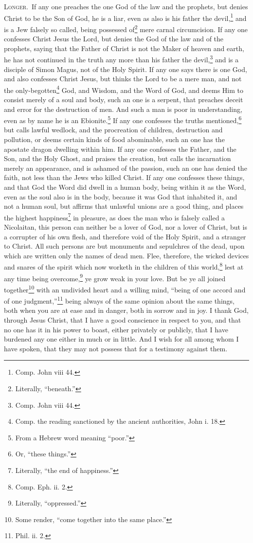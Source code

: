 \textsc{Longer.}~If any one preaches the one God of the law and the prophets, but denies Christ to be the Son of God, he is a liar, even as also is his father the devil,\footnote{Comp. John viii 44.} and is a Jew falsely so called, being possessed of\footnote{Literally, “beneath.”} mere carnal circumcision. If any one confesses Christ Jesus the Lord, but denies the God of the law and of the prophets, saying that the Father of Christ is not the Maker of heaven and earth, he has not continued in the truth any more than his father the devil,\footnote{Comp. John viii 44.} and is a disciple of Simon Magus, not of the Holy Spirit. If any one says there is one God, and also confesses Christ Jesus, but thinks the Lord to be a mere man, and not the only-begotten\footnote{Comp. the reading sanctioned by the ancient authorities, John i. 18.} God, and Wisdom, and the Word of God, and deems Him to consist merely of a soul and body, such an one is a serpent, that preaches deceit and error for the destruction of men. And such a man is poor in understanding, even as by name he is an Ebionite.\footnote{From a Hebrew word meaning “poor.”} If any one confesses the truths mentioned,\footnote{Or, “these things.”} but calls lawful wedlock, and the procreation of children, destruction and pollution, or deems certain kinds of food abominable, such an one has the apostate dragon dwelling within him. If any one confesses the Father, and the Son, and the Holy Ghost, and praises the creation, but calls the incarnation merely an appearance, and is ashamed of the passion, such an one has denied the faith, not less than the Jews who killed Christ. If any one confesses these things, and that God the Word did dwell in a human body, being within it as the Word, even as the soul also is in the body, because it was God that inhabited it, and not a human soul, but affirms that unlawful unions are a good thing, and places the highest happiness\footnote{Literally, “the end of happiness.”} in pleasure, as does the man who is falsely called a Nicolaitan, this person can neither be a lover of God, nor a lover of Christ, but is a corrupter of his own flesh, and therefore void of the Holy Spirit, and a stranger to Christ. All such persons are but monuments and sepulchres of the dead, upon which are written only the names of dead men. Flee, therefore, the wicked devices and snares of the spirit which now worketh in the children of this world,\footnote{Comp. Eph. ii. 2.} lest at any time being overcome,\footnote{Literally, “oppressed.”} ye grow weak in your love. But be ye all joined together\footnote{Some render, “come together into the same place.”} with an undivided heart and a willing mind, “being of one accord and of one judgment,”\footnote{Phil. ii. 2.} being always of the same opinion about the same things, both when you are at ease and in danger, both in sorrow and in joy. I thank God, through Jesus Christ, that I have a good conscience in respect to you, and that no one has it in his power to boast, either privately or publicly, that I have burdened any one either in much or in little. And I wish for all among whom I have spoken, that they may not possess that for a testimony against them.

